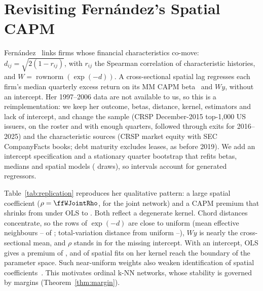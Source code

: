 \documentclass[letterpaper]{article} %
\theoremstyle{definition}
\begin{document}
\section{Revisiting Fern\'andez's Spatial CAPM}\label{sec:replication}
Fern\'andez~\citep{fernandez2011} links firms whose financial characteristics
co-move: $d_{ij}=\sqrt{2(1-r_{ij})}$, with $r_{ij}$ the Spearman correlation of
characteristic histories, and $W=\operatorname{rownorm}(\exp(-d))$. A
cross-sectional spatial lag regresses each firm's median quarterly excess
return on its MM CAPM beta~\citep{yohai1987} and $Wy$, without an intercept.
Her 1997--2006 data are not available to us, so this is a reimplementation:
we keep her outcome, betas, distance, kernel, estimators and lack of intercept,
and change the sample (CRSP December-2015 top-1{,}000 US issuers, \ffWRoster{}
on the roster and \ffWIssuers{} with enough quarters, followed through exits
for 2016--2025) and the characteristic sources (CRSP market equity with SEC
CompanyFacts books; debt maturity excludes leases, as before 2019). We add an
intercept specification and a stationary quarter bootstrap that refits betas,
medians and spatial models (\ffWGeneratedDraws{} draws), so intervals account
for generated regressors.

\begin{table}[t]
  \centering\small
  \resizebox{\columnwidth}{!}{}
  \caption{Fern\'andez reimplementation, spatial lag ML without intercept
    (her specification), 2015 formation. Premia are per quarter; intervals are
    bootstrap percentiles.}
  \label{tab:replication}
\end{table}

Table~\ref{tab:replication} reproduces her qualitative pattern: a large spatial
coefficient ($\rho=\ffWJointRho$, \ffWJointRhoCi{} for the joint network) and a
CAPM premium that shrinks from \ffWOlsPremiumWithout{} under OLS to
\ffWJointPremium. Both reflect a degenerate kernel. Chord distances concentrate,
so the rows of $\exp(-d)$ are close to uniform (mean effective neighbours
\ffWExpEffMin--\ffWExpEffMax{} of \ffWIssuers; total-variation distance from
uniform \ffWExpUniformMin--\ffWExpUniformMax), $Wy$ is nearly the
cross-sectional mean, and $\rho$ stands in for the missing intercept. With an
intercept, OLS gives a premium of \ffWOlsPremiumWith{} \ffWOlsPremiumWithCi,
and \ffWInterceptBoundary{} of \ffWInterceptFits{} spatial fits on her kernel
reach the boundary of the parameter space. Such near-uniform weights also
weaken identification of spatial coefficients~\citep{lee2004}. This motivates
ordinal k-NN networks, whose stability is governed by margins
(Theorem~\ref{thm:margin}).
\end{document}
